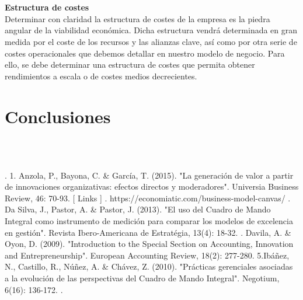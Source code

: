 \documentclass[twoside,twocolumn]{article}
\begin{document}
\begin{flushright}
\begin{itemize}
\textbf{}\\\textbf{}\\
\textbf{Estructura de costes}\\
Determinar con claridad la estructura de costes de la empresa es la piedra angular de la viabilidad económica. Dicha estructura vendrá determinada en gran medida por el coste de los recursos y las alianzas clave, así como por otra serie de costes operacionales que debemos detallar en nuestro modelo de negocio. Para ello, se debe determinar una estructura de costes que permita obtener rendimientos a escala o de costes medios decrecientes.





\section{Conclusiones}






\textbf{}\\
\textbf{}\\

\begin{thebibliography}{99} %



. 1. Anzola, P., Bayona, C. \& García, T. (2015). "La generación de valor a partir de innovaciones organizativas: efectos directos y moderadores". Universia Business Review, 46: 70-93.         [ Links ]
 \break
{}. https://economiatic.com/business-model-canvas/
\break
{}. Da Silva, J., Pastor, A. \& Pastor, J. (2013). "El uso del Cuadro de Mando Integral como instrumento de medición para comparar los modelos de excelencia en gestión". Revista Ibero-Americana de Estratégia, 13(4): 18-32.
\break
{}. Davila, A. \& Oyon, D. (2009). "Introduction to the Special Section on Accounting, Innovation and Entrepreneurship". European Accounting Review, 18(2): 277-280. 
\break
\newblock
5.Ibáñez, N., Castillo, R., Núñez, A. \& Chávez, Z. (2010). "Prácticas gerenciales asociadas a la evolución de las perspectivas del Cuadro de Mando Integral". Negotium, 6(16): 136-172.
\break
{}.
\break


\newblock {\em }
 
\end{thebibliography}

\end{itemize}
\end{flushright}
\end{document}
